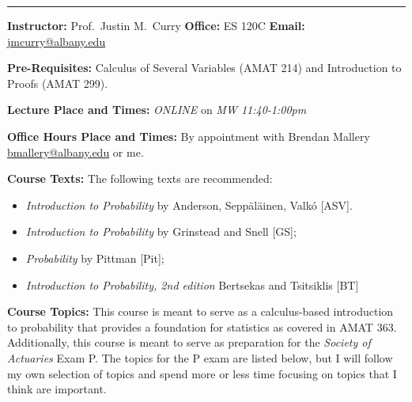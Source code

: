\documentclass[11pt,reqno]{amsproc}
\begin{document}
\begin{center}
	{\Large \color{Black}{AMAT 362---Probability for Statistics---Spring 2021 Syllabus}}
	\noindent\rule{\textwidth}{0.1pt}

	\textbf{Instructor:} Prof.~Justin M.~Curry \quad \textbf{Office:} ES 120C \quad \textbf{Email:} \url{jmcurry@albany.edu}
\end{center}

\noindent\textbf{Pre-Requisites:} Calculus of Several Variables (AMAT 214) and Introduction to Proofs (AMAT 299).

\noindent\textbf{Lecture Place and Times:} \emph{ONLINE} on \emph{MW 11:40-1:00pm}

\noindent\textbf{Office Hours Place and Times:} By appointment with Brendan Mallery \url{bmallery@albany.edu} or me.

\noindent\textbf{Course Texts:} The following texts are recommended:
\begin{itemize}
  \item \emph{Introduction to Probability} by Anderson, Sepp\"{a}l\"{a}inen, Valk\'{o} [ASV].
  \item \emph{Introduction to Probability} by Grinstead and Snell [GS];
  \item \emph{Probability} by Pittman [Pit];
  \item \emph{Introduction to Probability, 2nd edition} Bertsekas and Tsitsiklis [BT]
\end{itemize}

\noindent\textbf{Course Topics:}
This course is meant to serve as a calculus-based introduction to probability that provides a foundation for statistics as covered in AMAT 363.
Additionally, this course is meant to serve as preparation for the \emph{Society of Actuaries} Exam P. The topics for the P exam are listed below, but I will follow my own selection of topics and spend more or less time focusing on topics that I think are important.
\end{document}
